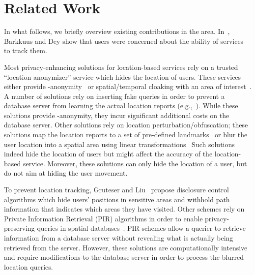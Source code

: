 \documentclass{llncs}
\begin{document}
\section{Related Work}\label{sec:related}

In what follows, we briefly overview existing contributions in the area.
In~\cite{Barkhuus03location-basedservices}, Barkkuus and Dey show that users were concerned about the ability of services to track them.

Most privacy-enhancing solutions for location-based services rely on a trusted ``location anonymizer'' service which hides the location of users. These services either
provide -anonymity~\cite{Guha:2012:KLP:2228298.2228317,Gedik:2008:PLP:1340084.1340202,Sweeney:2002:AKA:774544.774553,Sweeney:2002:KAM:774544.774552,Samarati:2001:PRI:627337.628183} or spatial/temporal cloaking with an area of
interest~\cite{Chow:2007:EPC:1784462.1784477,Bamba:2008:SAL:1367497.1367531,Gruteser:2003:AUL:1066116.1189037,Kalnis:2007:PLI:1313047.1313203,DBLP:conf/infocom/WangXHZLX12}. A number of solutions rely on inserting fake queries in order to prevent a database server from learning the actual location reports (e.g.,~\cite{Kido05ananonymous}). While these
solutions provide -anonymity, they incur significant additional costs on the database server. Other solutions rely on location perturbation/obfuscation; these solutions map the location reports to a set of pre-defined landmarks~\cite{Hong:2004:APU:990064.990087} or blur
the user location into a spatial area using linear transformations~\cite{Bamba:2008:SAL:1367497.1367531,Gruteser:2003:AUL:1066116.1189037,Kalnis:2007:PLI:1313047.1313203,Mokbel:2006:NCQ:1182635.1164193,Yiu:2010:ESS:1825238.1825264}
Such solutions indeed hide the location of users but might affect the accuracy of the location-based service. Moreover, these solutions
can only hide the location of a user, but do not aim at hiding the user movement.

To prevent location tracking, Gruteser and Liu~\cite{Gruteser:2004:PPC:1435702.1437404} propose disclosure control algorithms which hide users' positions in sensitive areas and withhold path information that
indicates which areas they have visited. Other schemes rely on Private Information Retrieval (PIR) algorithms in order to enable privacy-preserving queries in spatial databases~\cite{Ghinita:2008:PQL:1376616.1376631,Olumofin:2010:AEQ:1881151.1881157}. PIR schemes allow a querier to retrieve information
from a database server without revealing what is actually being retrieved
from the server. However, these solutions
are computationally intensive and require modifications to the database server in order to process the blurred location queries.
\end{document}
